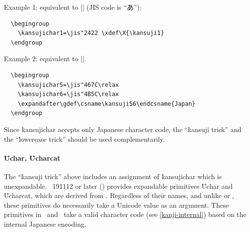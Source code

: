 \documentclass[a4paper,11pt,dvipdfmx]{article}
\let\emph=\origemph
\begin{document}
Example 1: equivalent to |\def\X{あ}| (JIS code  is ``あ''):
\begin{verbatim}
  \begingroup
    \kansujichar1=\jis"2422 \xdef\X{\kansuji1}
  \endgroup
\end{verbatim}

Example 2: equivalent to |\def\日本{Japan}|.
\begin{verbatim}
  \begingroup
    \kansujichar5=\jis"467C\relax
    \kansujichar6=\jis"4B5C\relax
    \expandafter\gdef\csname\kansuji56\endcsname{Japan}
  \endgroup
\end{verbatim}

Since \.{kansujichar} accepts only Japanese character code,
the ``\.{kansuji} trick'' and the ``\.{lowercase} trick'' should be
used complementarily.

\paragraph{\.{Uchar}, \.{Ucharcat}}
The ``\.{kansuji} trick'' above includes an assignment of \.{kansujichar}
which is unexpandable.
\epTeX~191112 or later () provides expandable primitives
\.{Uchar} and \.{Ucharcat}, which are derived from .
Regardless of their names, and unlike  or ,
these primitives do \emph{not} necessarily take
a Unicode value as an argument.
These primitives in \epTeX\ and \eupTeX\ take a valid character code
(see \ref{kanji-internal}) based on the internal Japanese encoding.
\end{document}
